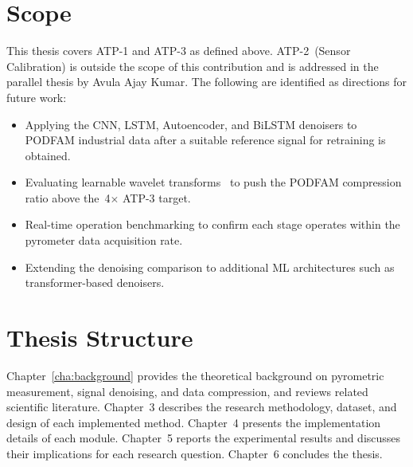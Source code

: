 \section{Scope}
\label{sec:scope}

This thesis covers ATP-1 and ATP-3 as defined above. ATP-2~(Sensor Calibration) is outside the scope of this contribution and is addressed in the parallel thesis by Avula Ajay Kumar. The following are identified as directions for future work:

\begin{itemize}[leftmargin=2em]
\item Applying the CNN, LSTM, Autoencoder, and BiLSTM denoisers to PODFAM industrial data after a suitable reference signal for retraining is obtained.
\item Evaluating learnable wavelet transforms~\cite{learnable_wavelet} to push the PODFAM compression ratio above the~4$\times$ ATP-3 target.
\item Real-time operation benchmarking to confirm each stage operates within the pyrometer data acquisition rate.
\item Extending the denoising comparison to additional ML architectures such as transformer-based denoisers.
\end{itemize}

\section{Thesis Structure}
\label{sec:thesis_structure}

Chapter~\ref{cha:background} provides the theoretical background on pyrometric measurement, signal denoising, and data compression, and reviews related scientific literature. Chapter~3 describes the research methodology, dataset, and design of each implemented method. Chapter~4 presents the implementation details of each module. Chapter~5 reports the experimental results and discusses their implications for each research question. Chapter~6 concludes the thesis.

\let\cleardoublepage\clearpage
